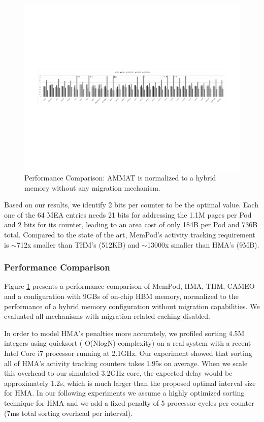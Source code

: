 \begin{figure}[t]
  \includegraphics[width=\textwidth]{figures/revised/new/comparison_no_cache.pdf}
  \caption{Performance Comparison: AMMAT is normalized to a hybrid memory without any migration mechanism.}
  \label{fig:performance}
\end{figure}

Based on our results, we identify 2 bits per counter to be the optimal value. Each one of the 64 MEA entries needs 21 bits for addressing the 1.1M pages per Pod and 2 bits for its counter, leading to an area cost of only 184B per Pod and 736B total. Compared to the state of the art, MemPod's activity tracking requirement is $\sim$712x smaller than THM's (512KB) and $\sim$13000x smaller than HMA's (9MB).



\subsubsection{Performance Comparison}
\label{sub:performance}

Figure \ref{fig:performance} presents a performance comparison of MemPod, HMA, THM, CAMEO and a configuration with 9GBs of on-chip HBM memory, normalized to the performance of a hybrid memory configuration without migration capabilities. We evaluated all mechanisms with migration-related caching disabled. 

In order to model HMA's penalties more accurately, we profiled sorting 4.5M integers using quicksort ( O(NlogN) complexity) on a real system with a recent Intel Core i7 processor running at 2.1GHz. Our experiment showed that sorting all of HMA's activity tracking counters takes 1.95s on average. When we scale this overhead to our simulated 3.2GHz core, the expected delay would be approximately 1.2s, which is much larger than the proposed optimal interval size for HMA. In our following experiments we assume a highly optimized sorting technique for HMA and we add a fixed penalty of 5 processor cycles per counter (7ms total sorting overhead per interval).

